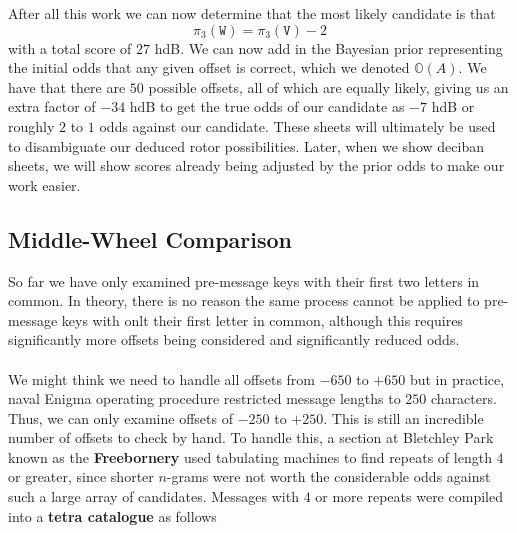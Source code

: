 \noindent After all this work we can now determine that the most
likely candidate is that
\[
  \pi_3(\texttt{W}) = \pi_3(\texttt{V}) - 2
\]
with a total score of $27$ hdB. We can now add in the Bayesian
prior representing the initial odds that any given offset is
correct, which we denoted $\mathbb{O}(A)$. We have that there are
$50$ possible offsets, all of which are equally likely, giving us
an extra factor of $-34$ hdB to get the true odds of our candidate
as $-7$ hdB or roughly $2$ to $1$ odds against our candidate. These
sheets will ultimately be used to disambiguate our deduced rotor
possibilities. Later, when we show deciban sheets, we will show
scores already being adjusted by the prior odds to make our work easier.

\subsection{Middle-Wheel Comparison}
So far we have only examined pre-message keys with their first two
letters in common. In theory, there is no reason the same process
cannot be applied to pre-message keys with onlt their first letter in
common, although this requires significantly more offsets being
considered and significantly reduced odds.
\\\\We might think we need to handle all offsets from $-650$ to
$+650$ but in practice, naval Enigma operating procedure restricted
message lengths to $250$ characters. Thus, we can only examine
offsets of $-250$ to $+250$. This is still an incredible number of
offsets to check by hand. To handle this, a section at Bletchley
Park known as the {\bf{Freebornery}} used tabulating machines to
find repeats of length $4$ or greater, since shorter $n$-grams were
not worth the considerable odds against such a large array of
candidates. Messages with $4$ or more repeats were compiled into a
{\bf{tetra catalogue}} as follows

